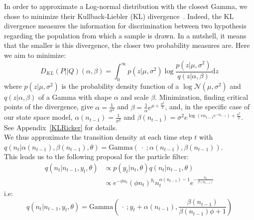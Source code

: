 \documentclass[12pt]{article}
\begin{document}
	In order to approximate a Log-normal distribution with the closest Gamma, we chose to minimize their Kullback-Liebler (KL) divergence~\cite{kullback1951information}. Indeed, the KL divergence measures the information for discrimination between two hypothesis regarding the population from which a sample is drawn. In a nutshell, it means that the smaller is this divergence, the closer two probability measures are. Here we aim to minimize:
	\begin{equation}
	D_{KL}(P||Q)(\alpha, \beta) = \int_{0}^{\infty}{p(z|\mu, \sigma^2)\log\frac{p(z|\mu, \sigma^2)}{q(z|\alpha, \beta)}\mathrm{d}z}
	\end{equation}
	where $p(z|\mu, \sigma^2)$ is the probability density function of a $\log\mathcal{N}(\mu, \sigma^2)$ and $q(z|\alpha, \beta)$ of a Gamma with shape $\alpha$ and scale $\beta$. Minimization, finding critical points of the divergence, give $\alpha =\frac{1}{\sigma^2}$ and $\beta=\frac{1}{\alpha}e^{\mu+\frac{\sigma^2}{2}}$, and, in the specific case of our state space model, $\alpha(n_{t-1})= \frac{1}{\sigma^2}$ and $\beta(n_{t-1})=\sigma^2e^{\log(rn_{t-1}e^{-n_{t-1}})+\frac{\sigma^2}{2}}$. See Appendix~\ref{KLRicker} for details. \\
	We thus approximate the transition density at each time step $t$ with $q(n_t|\alpha(n_{t-1}), \beta(n_{t-1}), \theta) = \mathrm{Gamma}(\ \cdot \ ; \alpha(n_{t-1}), \beta(n_{t-1}) )$. \\
	This leads us to the following proposal for the particle filter:
	\begin{equation*}
	\begin{split}
	q(n_t|n_{t-1}, y_t, \theta) & \propto  p(y_t|n_t, \theta)q(n_t|n_{t-1}, \theta) \\
	& \propto e^{-\phi n_t}(\phi n_t)^{y_t}n_t^{\alpha(n_{t-1})-1}e^{-\frac{n_t}{\beta(n_{t-1})}}
	\end{split}
	\end{equation*}
	i.e:
	\begin{equation*}
	q(n_t|n_{t-1}, y_t, \theta) = \mathrm{Gamma}(\ \cdot \ ; y_t+\alpha(n_{t-1}), \frac{\beta(n_{t-1})}{\beta(n_{t-1})\phi + 1})\end{equation*}
	
\end{document}
